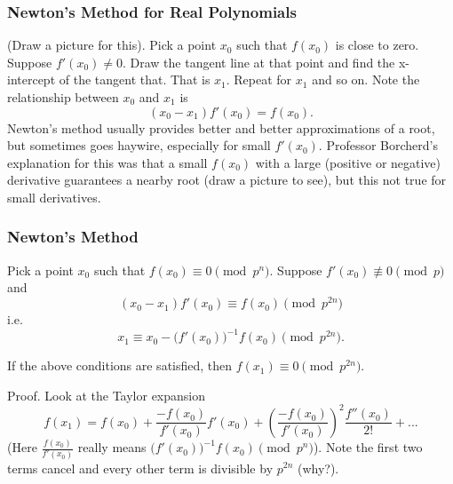 \documentclass{article}
\begin{document}
\subsubsection{Newton's Method for Real Polynomials}
(Draw a picture for this). Pick a point $x_{0}$ such that $f(x_{0})$ is close to zero. Suppose $f'(x_{0}) \neq 0$. Draw the tangent line at that point and find the x-intercept of the tangent that. That is $x_{1}$. Repeat for $x_{1}$ and so on. 
    Note the relationship between $x_{0}$ and $x_{1}$ is
\begin{equation}
    (x_{0} - x_{1})f'(x_{0}) = f(x_{0}).
\end{equation}
Newton's method usually provides better and better approximations of a root, but sometimes goes haywire, especially for small $f'(x_{0})$. Professor Borcherd's explanation for this was that a small $f(x_{0})$ with a large (positive or negative) derivative guarantees a nearby root (draw a picture to see), but this not true for small derivatives.

\subsubsection{Newton's Method}
Pick a point $x_{0}$ such that $f(x_{0}) \equiv 0 \pmod{p^{n}}$. Suppose $f'(x_{0}) \not\equiv 0 \pmod{p}$ and
\begin{equation}
    (x_{0} - x_{1})f'(x_{0}) \equiv f(x_{0}) \pmod{p^{2n}}
\end{equation}
i.e.
\begin{equation}
    x_{1} \equiv x_{0} - \big(f'(x_{0})\big)^{-1}f(x_{0}) \pmod{p^{2n}}.
\end{equation}
\begin{thm}[Newton]
    If the above conditions are satisfied, then $f(x_{1}) \equiv 0 \pmod{p^{2n}}$.
\end{thm}
Proof. Look at the Taylor expansion
\begin{equation}
    f(x_{1}) = f(x_{0}) + \frac{-f(x_{0})}{f'(x_{0})}f'(x_{0})
    + (\frac{-f(x_{0})}{f'(x_{0})})^{2}\frac{f''(x_{0})}{2!}
    + ...
\end{equation}
(Here $\frac{f(x_{0})}{f'(x_{0})}$ really means $\big(f'(x_{0})\big)^{-1}f(x_{0}) \pmod{p^{n}}$). Note the first two terms cancel and every other term is divisible by $p^{2n}$ (why?).
\end{document}
